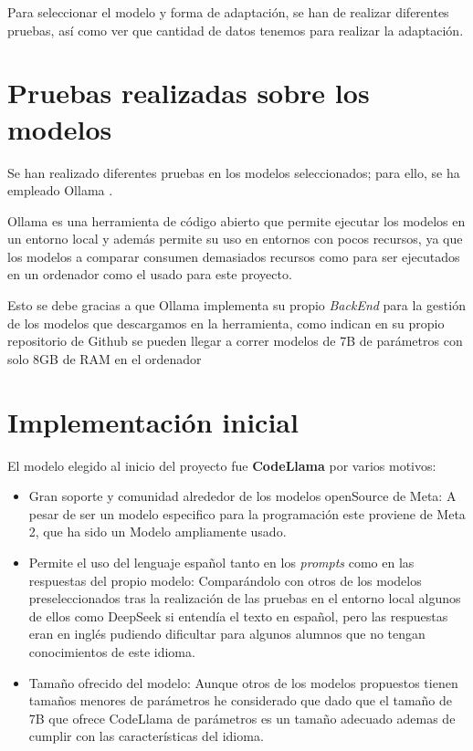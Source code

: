 
Para seleccionar el modelo y forma de adaptación, se han de realizar diferentes pruebas, así como ver que cantidad de datos tenemos para realizar la adaptación.

\section{Pruebas realizadas sobre los modelos}
Se han realizado diferentes  pruebas en los modelos seleccionados; para ello, se ha empleado Ollama \cite{Ollama}.

Ollama \cite{Ollama} es una herramienta de código abierto que permite ejecutar los modelos en un entorno local y además permite su uso en entornos con pocos recursos, ya que los modelos a comparar consumen demasiados recursos como para ser ejecutados en un ordenador como el usado para este proyecto.

Esto se debe gracias a que Ollama implementa su propio \textit{BackEnd} para la gestión de los modelos que descargamos en la herramienta, como indican en su propio repositorio de Github se pueden llegar a correr modelos de 7B de parámetros con solo 8GB de RAM en el ordenador \cite{GithubOllama} \cite{InformacionOllama}


\section{Implementación inicial}

El modelo elegido al inicio del proyecto fue \textbf{CodeLlama} por varios motivos:

\begin{itemize}
    \item Gran soporte y comunidad alrededor de los modelos openSource de Meta: A pesar de ser un modelo especifico para la programación este proviene de Meta 2, que ha sido un Modelo ampliamente usado.
    \item Permite el uso del lenguaje español tanto en los \textit{prompts} como en las respuestas del propio modelo: Comparándolo con otros de los modelos preseleccionados tras la realización de las pruebas en el entorno local algunos de ellos como DeepSeek si entendía el texto en español, pero las respuestas eran en inglés pudiendo dificultar para algunos alumnos que no tengan conocimientos de este idioma.
    \item Tamaño ofrecido del modelo: Aunque otros de los modelos propuestos tienen tamaños menores de parámetros he considerado que dado que el tamaño de 7B que ofrece CodeLlama de parámetros es un tamaño adecuado ademas de cumplir con las características del idioma.
\end{itemize}

